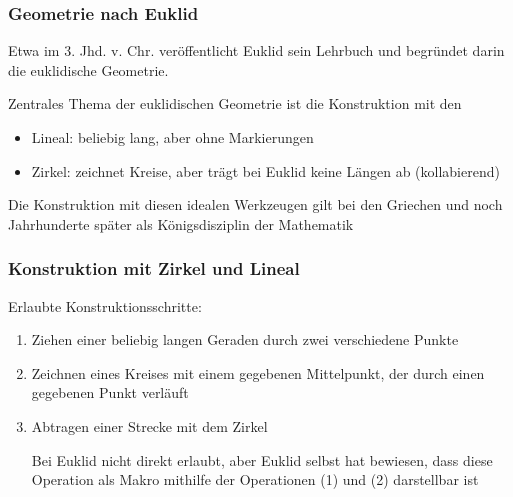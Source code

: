 \documentclass[aspectratio=1610,onlymath]{beamer}
\begin{document}
\begin{frame}\frametitle{Geometrie nach Euklid}

Etwa im 3. Jhd. v. Chr. veröffentlicht Euklid sein Lehrbuch 
 und begründet darin die euklidische Geometrie.
\bigskip

Zentrales Thema der euklidischen Geometrie ist die
Konstruktion mit den 

\begin{itemize}
\item \alert{Lineal:} beliebig lang, aber ohne Markierungen
\item \alert{Zirkel:} zeichnet Kreise, aber trägt bei Euklid keine Längen ab (kollabierend)
\end{itemize}

Die Konstruktion mit diesen idealen Werkzeugen gilt bei den Griechen und noch
Jahrhunderte später als Königsdisziplin der Mathematik

\end{frame}

\begin{frame}\frametitle{Konstruktion mit Zirkel und Lineal}


\alert{Erlaubte Konstruktionsschritte:}
\begin{enumerate}[(1)]
\item Ziehen einer beliebig langen Geraden durch zwei verschiedene Punkte
\item Zeichnen eines Kreises mit einem gegebenen Mittelpunkt, der durch einen gegebenen Punkt verläuft
\item Abtragen einer Strecke mit dem Zirkel\\[0.5ex]
{\tiny Bei Euklid nicht direkt erlaubt, aber Euklid selbst hat bewiesen, dass diese Operation als Makro mithilfe der Operationen (1) und (2) darstellbar ist

}
\end{enumerate}


\end{frame}
\end{document}
